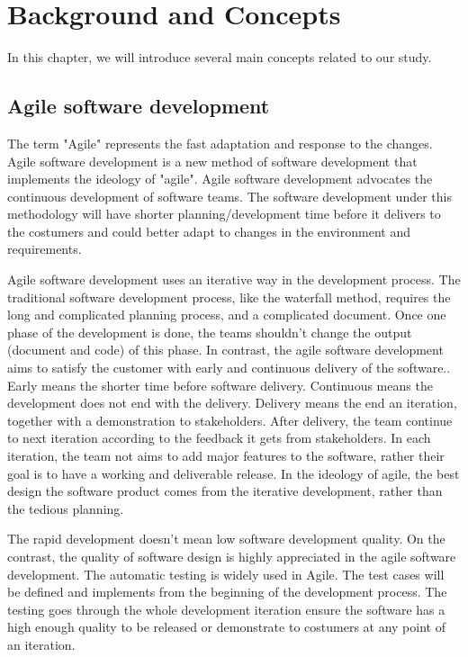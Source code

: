 \chapter{Background and Concepts}
In this chapter, we will introduce several main concepts related to our study.
\section{Agile software development}
\label{agile}
The term "Agile" represents the fast adaptation and response to the changes.\cite{WhatisAg98:online}
Agile software development is a new method of software development that implements the ideology of "agile". Agile software development advocates the continuous development of software teams. The software development under this methodology will have shorter planning/development time before it delivers to the costumers and could better adapt to changes in the environment and requirements.
\par
Agile software development uses an iterative way in the development process. The traditional software development process, like the waterfall method, requires the long and complicated planning process, and a complicated document. Once one phase of the development is done, the teams shouldn't change the output (document and code) of this phase.\cite{cusumano1995beyond} In contrast, the agile software development aims to satisfy the customer with early and continuous delivery of the software.\cite{beck2001manifesto}. Early means the shorter time before software delivery. Continuous means the development does not end with the delivery. Delivery means the end an iteration, together with a demonstration to stakeholders. After delivery, the team continue to next iteration according to the feedback it gets from stakeholders. In each iteration, the team not aims to add major features to the software, rather their goal is to have a working and deliverable release\cite{beck1999embracing}. In the ideology of agile, the best design the software product comes from the iterative development, rather than the tedious planning.\cite{beck2001manifesto}
\par
The rapid development doesn't mean low software development quality. On the contrast, the quality of software design is highly appreciated in the agile software development. The automatic testing is widely used in Agile. The test cases will be defined and implements from the beginning of the development process. The testing goes through the whole development iteration ensure the software has a high enough quality to be released or demonstrate to costumers at any point of an iteration\cite{Agilesof32:online}.
